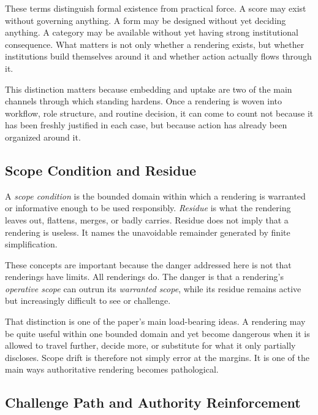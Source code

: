 \documentclass[11pt]{article}
\renewcommand{\emph}[1]{\textit{#1}}
\begin{document}
These terms distinguish formal existence from practical force. A score may exist without governing anything. A form may be designed without yet deciding anything. A category may be available without yet having strong institutional consequence. What matters is not only whether a rendering exists, but whether institutions build themselves around it and whether action actually flows through it.\cite{Lipsky1980StreetLevelBureaucracy,Power1997AuditSociety,Scott1998SeeingLikeState}

This distinction matters because embedding and uptake are two of the main channels through which standing hardens. Once a rendering is woven into workflow, role structure, and routine decision, it can come to count not because it has been freshly justified in each case, but because action has already been organized around it.

\subsection{Scope Condition and Residue}

A \emph{scope condition} is the bounded domain within which a rendering is warranted or informative enough to be used responsibly. \emph{Residue} is what the rendering leaves out, flattens, merges, or badly carries. Residue does not imply that a rendering is useless. It names the unavoidable remainder generated by finite simplification.\cite{Swanson2026ConstrainedDescribability,Swanson2026ConstraintConditionDisclosure}

These concepts are important because the danger addressed here is not that renderings have limits. All renderings do. The danger is that a rendering's \emph{operative scope} can outrun its \emph{warranted scope}, while its residue remains active but increasingly difficult to see or challenge.

That distinction is one of the paper's main load-bearing ideas. A rendering may be quite useful within one bounded domain and yet become dangerous when it is allowed to travel further, decide more, or substitute for what it only partially discloses. Scope drift is therefore not simply error at the margins. It is one of the main ways authoritative rendering becomes pathological.

\subsection{Challenge Path and Authority Reinforcement}
\end{document}
